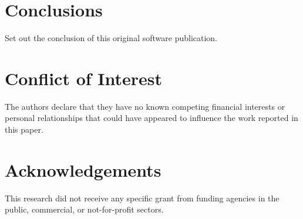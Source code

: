 \documentclass[preprint,12pt,letterpaper]{elsarticle}
\begin{document}

\section{Conclusions}
\label{s:conclusions}

Set out the conclusion of this original software publication.


\section{Conflict of Interest}


The authors declare that they have no known competing financial interests or personal relationships that could have appeared to influence the work reported in this paper.


\section*{Acknowledgements}
\label{}

This research did not receive any specific grant from funding agencies in the public, commercial, or not-for-profit sectors.






\end{document}
